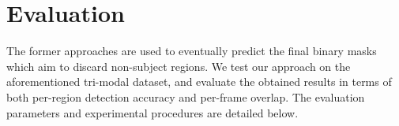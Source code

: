\documentclass[10pt,twocolumn,letterpaper]{article}
\begin{document}
%
%
%


\section{Evaluation}
\label{sec:evaluation}
The former approaches are used to eventually predict the final binary masks which aim to discard non-subject regions. We test our approach on the aforementioned tri-modal dataset, and evaluate the obtained results in terms of both per-region detection accuracy and per-frame overlap. The evaluation parameters and experimental procedures are detailed below. 
\end{document}
